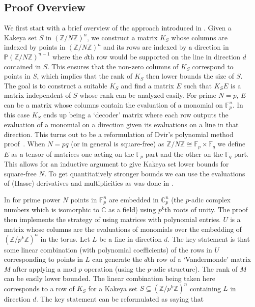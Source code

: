 \documentclass[11pt]{article}
\numberwithin{equation}{section}
\def\F{{\mathbb{F}}}
\def\Z{{\mathbb{Z}}}
\def\C{{\mathbb{C}}}
\def\P{{\mathbb{P}}}
\begin{document}
\subsection{Proof Overview}\label{sec:proofOver}
We first start with a brief overview of the approach introduced in \cite{dhar2021proof}. Given a Kakeya set $S$ in $(\Z/N\Z)^n$, we construct a matrix $K_S$ whose columns are indexed by points in $(\Z/N\Z)^n$ and its rows are indexed by a direction in $\P (\Z/N\Z)^{n-1}$ where the $d$th row would be supported on the line in direction $d$ contained in $S$. This ensures that the non-zero columns of $K_S$ correspond to points in $S$, which implies that the rank of $K_S$ then lower bounds the size of $S$. The goal is to construct a suitable $K_S$ and find a matrix $E$ such that $K_SE$ is a matrix independent of $S$ whose rank can be analyzed easily. For prime $N=p$, $E$ can be a matrix whose columns contain the evaluation of a monomial on $\F_p^n$. In this case $K_S$ ends up being a `decoder' matrix where each row outputs the evaluation of a monomial on a direction given its evaluations on a line in that direction. This turns out to be a reformulation of Dvir's polynomial method proof~\cite{dvir2009size}. When $N=pq$ (or in general is square-free) as $\Z/N\Z\cong \F_p\times \F_q$ we define $E$ as a tensor of matrices one acting on the $\F_p$ part and the other on the $\F_q$ part. This allows for an inductive argument to give Kakeya set lower bounds for square-free $N$. To get quantitatively stronger bounds we can use the evaluations of (Hasse) derivatives and multiplicities as was done in \cite{saraf2008,dvir2013extensions}.

In \cite{arsovski2021padic} for prime power $N$ points in $\F_p^n$ are embedded in $\C_p^n$ (the $p$-adic complex numbers which is isomorphic to $\C$ as a field) using $p^k$th roots of unity. The proof then implements the strategy of \cite{dhar2021proof} using matrices with polynomial entries. $U$ is a matrix whose columns are the evaluations of monomials over the embedding of $(\Z/p^k\Z)^n$ in the torus. Let $L$ be a line in direction $d$. The key statement is that some linear combination (with polynomial coefficients) of the rows in $U$ corresponding to points in $L$ can generate the $d$th row of a `Vandermonde' matrix $M$ after applying a mod $p$ operation (using the $p$-adic structure). The rank of $M$ can be easily lower bounded. The linear combination being taken here corresponds to a row of $K_S$ for a Kakeya set $S\subseteq (\Z/p^k\Z)^n$ containing $L$ in direction $d$. The key statement can be reformulated as saying that 
\end{document}
